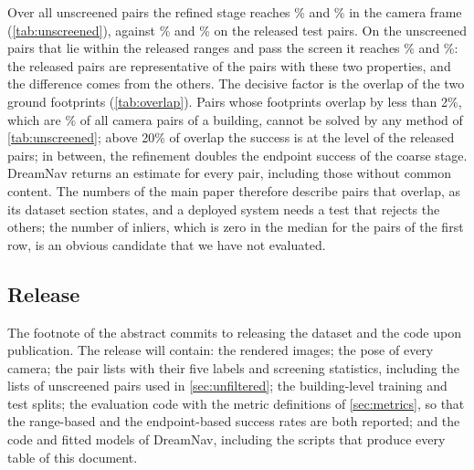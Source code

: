 

Over all unscreened pairs the refined stage reaches \unSiiSRd\% \SRd{} and \unSiiSRe\% \SRe{} in the camera frame (\cref{tab:unscreened}), against \SiiCamSRd\% and \SiiCamSRe\% on the released test pairs. On the unscreened pairs that lie within the released ranges and pass the screen it reaches \unInSiiSRd\% and \unInSiiSRe\%: the released pairs are representative of the pairs with these two properties, and the difference comes from the others. The decisive factor is the overlap of the two ground footprints (\cref{tab:overlap}). Pairs whose footprints overlap by less than 2\%, which are \unNoOverlap\% of all camera pairs of a building, cannot be solved by any method of \cref{tab:unscreened}; above 20\% of overlap the success is at the level of the released pairs; in between, the refinement doubles the endpoint success of the coarse stage. DreamNav returns an estimate for every pair, including those without common content. The numbers of the main paper therefore describe pairs that overlap, as its dataset section states, and a deployed system needs a test that rejects the others; the number of inliers, which is zero in the median for the pairs of the first row, is an obvious candidate that we have not evaluated.

\subsection{Release}

The footnote of the abstract commits to releasing the dataset and the code upon publication. The release will contain: the rendered images; the pose of every camera; the pair lists with their five labels and screening statistics, including the lists of unscreened pairs used in \cref{sec:unfiltered}; the building-level training and test splits; the evaluation code with the metric definitions of \cref{sec:metrics}, so that the range-based and the endpoint-based success rates are both reported; and the code and fitted models of DreamNav, including the scripts that produce every table of this document. 
